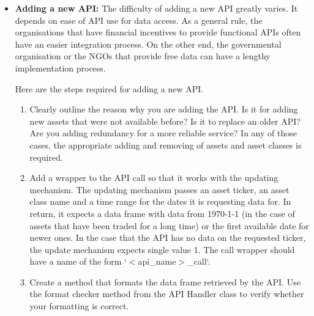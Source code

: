 \documentclass[main.tex]{subfiles}
\begin{document}
\begin{itemize}
    \item \textbf{Adding a new API: \newline}
        The difficulty of adding a new API greatly varies. It depends on ease of API use for data access. As a general rule, the organisations that have financial incentives to provide functional APIs often have an easier integration process. On the other end, the governmental organisation or the NGOs that provide free data can have a lengthy implementation process.
        
        Here are the steps required for adding a new API.
        \begin{enumerate}
            \item Clearly outline the reason why you are adding the API. Is it for adding new assets that were not available before? Is it to replace an older API? Are you adding redundancy for a more reliable service?
            In any of those cases, the appropriate adding and removing of assets and asset classes is required.
            \item Add a wrapper to the API call so that it works with the updating mechanism. The updating mechanism passes an asset ticker, an asset class name and a time range for the dates it is requesting data for. In return, it expects a data frame with data from 1970-1-1 (in the case of assets that have been traded for a long time) or the first available date for newer ones. In the case that the API has no data on the requested ticker, the update mechanism expects single value 1. The call wrapper should have a name of the form `$<$api\_name$>$\_call`. 
            \item Create a method that formats the data frame retrieved by the API. Use the format checker method from the API Handler class to verify whether your formatting is correct. 
        \end{enumerate}
    

\end{itemize}
\end{document}
